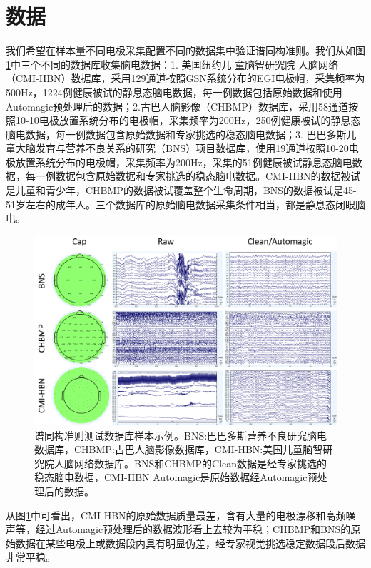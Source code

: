 \section{数据}
我们希望在样本量不同电极采集配置不同的数据集中验证谱同构准则。我们从如图\ref{database}中三个不同的数据库收集脑电数据：1. 美国纽约儿
童脑智研究院-人脑网络（CMI-HBN）数据库，采用129通道按照GSN系统分布的EGI电极帽，采集频率为500Hz，1224例健康被试的静息态脑电数据，每一例数据包括原始数据和使用Automagic预处理后的数据；2.古巴人脑影像（CHBMP）数据库，采用58通道按照10-10电极放置系统分布的电极帽，采集频率为200Hz，250例健康被试的静息态脑电数据，每一例数据包含原始数据和专家挑选的稳态脑电数据；3. 巴巴多斯儿童大脑发育与营养不良关系的研究（BNS）项目数据库，使用19通道按照10-20电极放置系统分布的电极帽，采集频率为200Hz，采集的51例健康被试静息态脑电数据，每一例数据包含原始数据和专家挑选的稳态脑电数据。CMI-HBN的数据被试是儿童和青少年，CHBMP的数据被试覆盖整个生命周期，BNS的数据被试是45-51岁左右的成年人。三个数据库的原始脑电数据采集条件相当，都是静息态闭眼脑电。
\begin{figure}[!h]
\includegraphics[width=15cm]{pic/palos/data.png}
\caption{谱同构准则测试数据库样本示例。BNS:巴巴多斯营养不良研究脑电数据库，CHBMP:古巴人脑影像数据库，CMI-HBN:美国儿童脑智研究院人脑网络数据库。BNS和CHBMP的Clean数据是经专家挑选的稳态脑电数据，CMI-HBN Automagic是原始数据经Automagic预处理后的数据。}
\label{database}
\end{figure}

从图\ref{database}中可看出，CMI-HBN的原始数据质量最差，含有大量的电极漂移和高频噪声等，经过Automagic预处理后的数据波形看上去较为平稳；CHBMP和BNS的原始数据在某些电极上或数据段内具有明显伪差，经专家视觉挑选稳定数据段后数据非常平稳。

